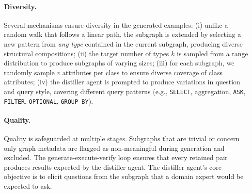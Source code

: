\paragraph{Diversity.} Several mechanisms ensure diversity in the generated examples: (i) unlike a random walk that follows a linear path, the subgraph is extended by selecting a new pattern from \textit{any type} contained in the current subgraph, producing diverse structural compositions; (ii) the target number of types $k$ is sampled from a range distribution to produce subgraphs of varying sizes; (iii) for each subgraph, we randomly sample $v$ attributes per class to ensure diverse coverage of class attributes; (iv) the distiller agent is prompted to produce variations in question and query style, covering different query patterns (e.g., \texttt{SELECT}, aggregation, \texttt{ASK}, \texttt{FILTER}, \texttt{OPTIONAL}, \texttt{GROUP BY}).

\paragraph{Quality.} Quality is safeguarded at multiple stages. Subgraphs that are trivial or concern only graph metadata are flagged as non-meaningful during generation and excluded. The generate-execute-verify loop ensures that every retained pair produces results expected by the distiller agent. The distiller agent's core objective is to elicit questions from the subgraph that a domain expert would be expected to ask.

\FloatBarrier